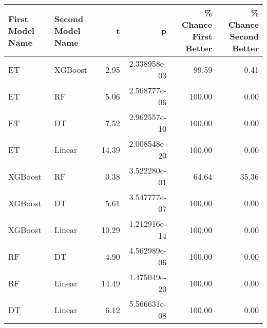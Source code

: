 \begin{tabular}{llrrrr}
\toprule
First Model Name & Second Model Name &     t &            p &  \% Chance First Better &  \% Chance Second Better \\
\midrule
              ET &           XGBoost &  2.95 & 2.338958e-03 &                  99.59 &                    0.41 \\
              ET &                RF &  5.06 & 2.568777e-06 &                 100.00 &                    0.00 \\
              ET &                DT &  7.52 & 2.962557e-10 &                 100.00 &                    0.00 \\
              ET &            Linear & 14.39 & 2.008548e-20 &                 100.00 &                    0.00 \\
         XGBoost &                RF &  0.38 & 3.522280e-01 &                  64.64 &                   35.36 \\
         XGBoost &                DT &  5.61 & 3.547777e-07 &                 100.00 &                    0.00 \\
         XGBoost &            Linear & 10.29 & 1.212916e-14 &                 100.00 &                    0.00 \\
              RF &                DT &  4.90 & 4.562989e-06 &                 100.00 &                    0.00 \\
              RF &            Linear & 14.49 & 1.475049e-20 &                 100.00 &                    0.00 \\
              DT &            Linear &  6.12 & 5.566631e-08 &                 100.00 &                    0.00 \\
\bottomrule
\end{tabular}
